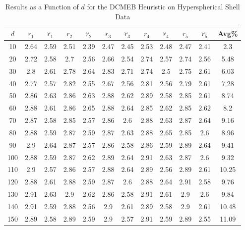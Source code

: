 \documentclass[11pt,twoside]{report}
\theoremstyle{definition}
\numberwithin{theorem}{section}
\numberwithin{definition}{section}
\numberwithin{lemma}{section}
\numberwithin{proposition}{section}
\numberwithin{equation}{section}
\numberwithin{figure}{section}
\begin{document}
\begin{appendices}
    \begin{table}[ht]
        \centering
        \begin{tabular}{|c||cc||cc||cc||cc||cc||c|} \hline
            $d$&$r_1$&$\hat{r}_1$&$r_2$&$\hat{r}_2$&$r_3$&$\hat{r}_3$&$r_4$&$\hat{r}_4$&$r_5$&$\hat{r}_5$&Avg\% \\ \hline
            10&2.64&2.59&2.51&2.39&2.47&2.45&2.53&2.48&2.47&2.41&2.3 \\
            20&2.72&2.58&2.7&2.56&2.66&2.54&2.74&2.57&2.74&2.56&5.48 \\
            30&2.8&2.61&2.78&2.64&2.83&2.71&2.74&2.5&2.75&2.61&6.03 \\
            40&2.77&2.57&2.82&2.55&2.67&2.56&2.81&2.56&2.79&2.61&7.28 \\
            50&2.86&2.63&2.86&2.63&2.88&2.62&2.89&2.58&2.85&2.61&8.74 \\
            60&2.88&2.61&2.86&2.65&2.88&2.64&2.85&2.62&2.85&2.62&8.2 \\
            70&2.87&2.58&2.85&2.57&2.86&2.6&2.88&2.63&2.87&2.64&9.16 \\
            80&2.88&2.59&2.87&2.59&2.87&2.63&2.88&2.65&2.85&2.6&8.96 \\
            90&2.9&2.64&2.87&2.57&2.86&2.58&2.86&2.59&2.89&2.64&9.41 \\
            100&2.88&2.59&2.87&2.62&2.89&2.64&2.91&2.63&2.87&2.6&9.32 \\
            110&2.9&2.57&2.86&2.57&2.88&2.64&2.89&2.56&2.89&2.61&10.25 \\
            120&2.88&2.61&2.88&2.59&2.87&2.6&2.88&2.64&2.91&2.58&9.76 \\
            130&2.91&2.63&2.9&2.62&2.86&2.58&2.91&2.61&2.9&2.6&9.84 \\
            140&2.91&2.59&2.88&2.56&2.9&2.61&2.89&2.58&2.9&2.61&10.48 \\
            150&2.89&2.58&2.89&2.59&2.9&2.57&2.91&2.59&2.89&2.55&11.09 \\ \hline
        \end{tabular}
        \caption{Results as a Function of $d$ for the DCMEB Heuristic on Hyperspherical Shell Data}
        \label{tab:hyperspherical_shell_dcmeb_table_d}
    \end{table}
    

\end{appendices}
\end{document}
